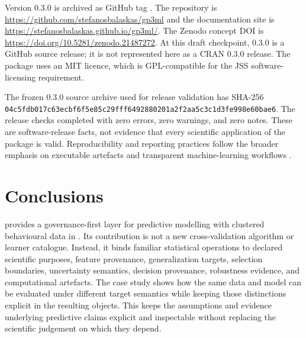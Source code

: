 \documentclass[article]{jss}
\begin{document}
\begin{sloppypar}
Version 0.3.0 is archived as GitHub tag . The repository is
\url{https://github.com/stefanosbalaskas/gp3ml} and the documentation site is
\url{https://stefanosbalaskas.github.io/gp3ml/}. The Zenodo concept DOI is
\url{https://doi.org/10.5281/zenodo.21487272}. At this draft checkpoint, 0.3.0 is a
GitHub source release; it is not represented here as a CRAN 0.3.0 release. The package
uses an MIT licence, which is GPL-compatible for the JSS software-licensing
requirement.
\end{sloppypar}

The frozen 0.3.0 source archive used for release validation has SHA-256
\texttt{04c5fdb0\allowbreak{}17c63ecb\allowbreak{}f6f5e85c\allowbreak{}29fff649\allowbreak{}2880201a\allowbreak{}2f2aa5c3\allowbreak{}c1d3fe99\allowbreak{}8e60bae6}.
The release checks completed with zero errors, zero warnings, and zero notes. These are
software-release facts, not evidence that every scientific application of the package
is valid. Reproducibility and reporting practices follow the broader emphasis on
executable artefacts and transparent machine-learning workflows
\citep{Pineau2021}.

\section{Conclusions}

 provides a governance-first layer for predictive modelling with clustered
behavioural data in . Its contribution is not a new cross-validation
algorithm or learner catalogue. Instead, it binds familiar statistical operations to
declared scientific purposes, feature provenance, generalization targets, selection
boundaries, uncertainty semantics, decision provenance, robustness evidence, and
computational artefacts. The case study shows how the same data and model can be
evaluated under different target semantics while keeping those distinctions explicit
in the resulting objects. This keeps the assumptions and evidence underlying predictive
claims explicit and inspectable without replacing the scientific judgement on which they depend.


\end{document}
